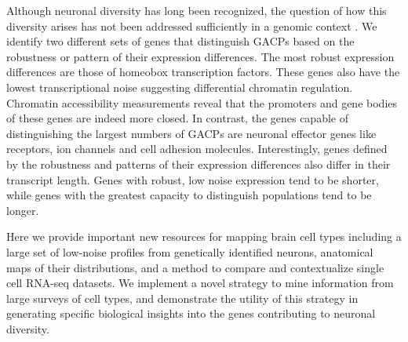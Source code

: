 Although neuronal diversity has long been recognized, the question of how this diversity arises has not been addressed sufficiently in a genomic context \citep{Arendt_2016, Muotri_2006}. We identify two different sets of genes that distinguish GACPs based on the robustness or pattern of their expression differences. The most robust expression differences are those of homeobox transcription factors. These genes also have the lowest transcriptional noise suggesting differential chromatin regulation. Chromatin accessibility measurements reveal that the promoters and gene bodies of these genes are indeed more closed. In contrast, the genes capable of distinguishing the largest numbers of GACPs are neuronal effector genes like receptors, ion channels and cell adhesion molecules. Interestingly, genes defined by the robustness and patterns of their expression differences also differ in their transcript length. Genes with robust, low noise expression tend to be shorter, while genes with the greatest capacity to distinguish populations tend to be longer.

Here we provide important new resources for mapping brain cell types including a large set of low-noise profiles from genetically identified neurons, anatomical maps of their distributions, and a method to compare and contextualize single cell RNA-seq datasets. We implement a novel strategy to mine information from large surveys of cell types, and demonstrate the utility of this strategy in generating specific biological insights into the genes contributing to neuronal diversity.


